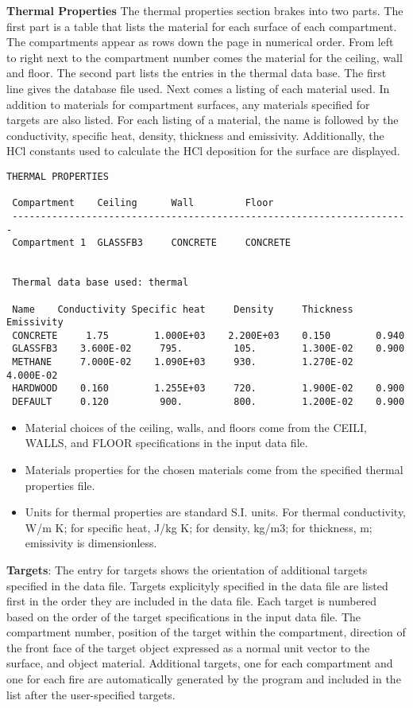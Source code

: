 \textbf{Thermal Properties} The thermal properties section brakes into two parts.  The first part is a table that lists the material for each surface of each compartment.  The compartments appear as rows down the page in numerical order.  From left to right next to the compartment number comes the material for the ceiling, wall and floor.  The second part lists the entries in the thermal data base.  The first line gives the database file used.  Next comes a listing of each material used. In addition to materials for compartment surfaces, any materials specified for targets are also listed.  For each listing of a material, the name is followed by the conductivity, specific heat, density, thickness and emissivity.  Additionally, the HCl constants used to calculate the HCl deposition for the surface are displayed.

\begin{lstlisting}[basicstyle=\tiny]
 THERMAL PROPERTIES

 Compartment    Ceiling      Wall         Floor
 ----------------------------------------------------------------------
 Compartment 1  GLASSFB3     CONCRETE     CONCRETE


 Thermal data base used: thermal

 Name    Conductivity Specific heat     Density     Thickness   Emissivity
 CONCRETE     1.75        1.000E+03    2.200E+03    0.150        0.940
 GLASSFB3    3.600E-02     795.         105.        1.300E-02    0.900
 METHANE     7.000E-02    1.090E+03     930.        1.270E-02    4.000E-02
 HARDWOOD    0.160        1.255E+03     720.        1.900E-02    0.900
 DEFAULT     0.120         900.         800.        1.200E-02    0.900
\end{lstlisting}

\begin{itemize}
\item Material choices of the ceiling, walls, and floors come from the CEILI, WALLS, and FLOOR specifications in the input data file.
\item Materials properties for the chosen materials come from the specified thermal properties file.
\item Units for thermal properties are standard S.I. units.  For thermal conductivity, W/m K; for specific heat, J/kg K; for density, kg/m3; for thickness, m; emissivity is dimensionless.
\end{itemize}

\textbf{Targets}: The entry for targets shows the orientation of additional targets specified in the data file. Targets explicityly specified in the data file are listed first in the order they are included in the data file.  Each target is numbered based on the order of the target specifications in the input data file.  The compartment number, position of the target within the compartment, direction of the front face of the target object expressed as a normal unit vector to the surface, and object material. Additional targets, one for each compartment and one for each fire are automatically generated by the program and included in the list after the user-specified targets.

